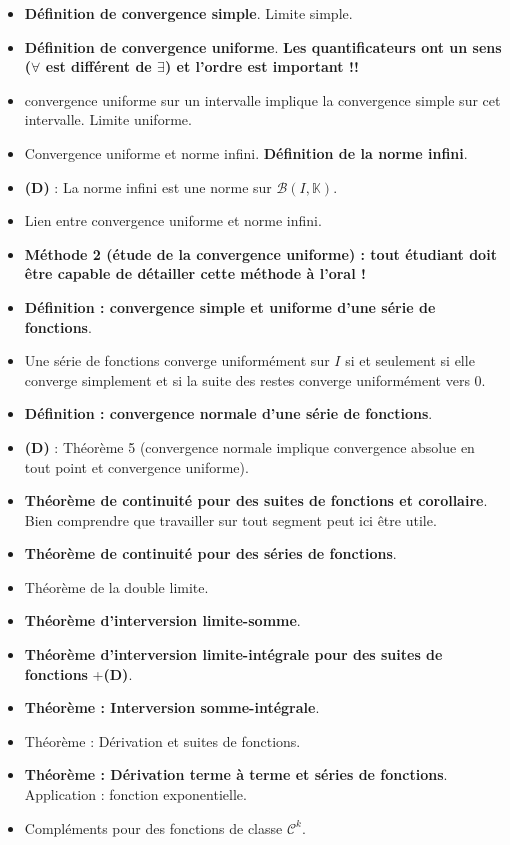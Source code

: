 \documentclass[twoside,a4paper,french,10pt]{VcCours}
\begin{document}
\begin{itemize}
\item \textbf{Définition de convergence simple}. Limite simple.
\item \textbf{Définition de convergence uniforme}. 
    \textbf{Les quantificateurs ont un sens ($\forall$ est différent de $\exists$) et l'ordre est important !!}
\item convergence uniforme sur un intervalle implique la 
    convergence simple sur cet intervalle. Limite uniforme.
\item Convergence uniforme et norme infini. 
    \textbf{Définition de la norme infini}.
\item \textbf{(D)} : La norme infini est une norme sur 
    $\mathcal{B}(I, \mathbb{K})$.
\item Lien entre convergence uniforme et norme infini.
\item \textbf{Méthode 2 (étude de la convergence uniforme) : 
    tout étudiant doit être capable de détailler cette méthode 
    à l'oral !}
\item \textbf{Définition : convergence simple et uniforme d'une série de fonctions}.
\item Une série de fonctions converge uniformément sur $I$ si et seulement si elle converge simplement et si la suite des restes converge uniformément vers $0$.
\item \textbf{Définition : convergence normale d'une série de fonctions}.
\item \textbf{(D)} : Théorème 5 (convergence normale implique convergence absolue en tout point et convergence uniforme).
\item \textbf{Théorème de continuité pour des suites de fonctions et corollaire}. Bien comprendre que travailler sur tout segment peut ici être utile.
\item \textbf{Théorème de continuité pour des séries de fonctions}.
\item Théorème de la double limite.
\item \textbf{Théorème d'interversion limite-somme}.
\item \textbf{Théorème d'interversion limite-intégrale pour des suites de fonctions} +\textbf{(D)}.
\item \textbf{Théorème : Interversion somme-intégrale}.
\item Théorème : Dérivation et suites de fonctions.
\item \textbf{Théorème : Dérivation terme à terme et séries de fonctions}. Application : fonction exponentielle.
\item Compléments pour des fonctions de classe $\mathcal{C}^k$.
\end{itemize}
\end{document}
